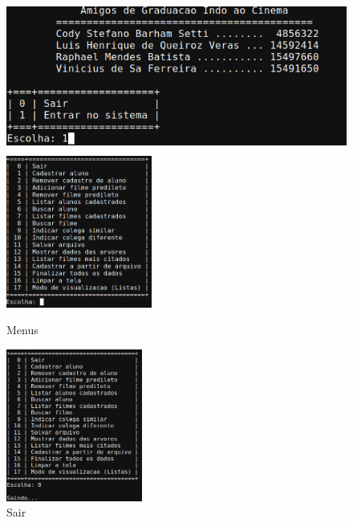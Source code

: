 \documentclass[12pt,a4paper,portuguese]{article}
\begin{document}
        \begin{figure}[H]
            \centering
            \includegraphics[height=5cm]{imgs/menu_inicial.png}
            \includegraphics[height=5cm]{imgs/menu_funcoes.png}
            \caption{Menus}
        \end{figure}

        \begin{figure}[H]
            \centering
            \includegraphics[height=5cm]{imgs/sair.png}
            \caption{Sair}
        \end{figure}
\end{document}
